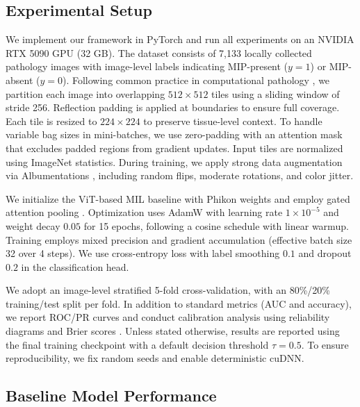 \documentclass[journal,twoside,web]{ieeecolor}
\begin{document}
\subsection{Experimental Setup}\label{S3-1}

We implement our framework in PyTorch and run all experiments on an NVIDIA RTX 5090 GPU (32 GB). The dataset consists of 7,133 locally collected pathology images with image-level labels indicating MIP-present ($y = 1$) or MIP-absent ($y = 0$). Following common practice in computational pathology \cite{campanella2019clinical,lu2021data}, we partition each image into overlapping $512 \times 512$ tiles using a sliding window of stride 256. Reflection padding is applied at boundaries to ensure full coverage. Each tile is resized to $224 \times 224$ to preserve tissue-level context. To handle variable bag sizes in mini-batches, we use zero-padding with an attention mask that excludes padded regions from gradient updates. Input tiles are normalized using ImageNet statistics. During training, we apply strong data augmentation via Albumentations \cite{buslaev2020albumentations}, including random flips, moderate rotations, and color jitter.

We initialize the ViT-based MIL baseline with Phikon weights \cite{filiot2023scaling} and employ gated attention pooling \cite{ilse2018attention}. Optimization uses AdamW \cite{loshchilov2017decoupled} with learning rate $1 \times 10^{-5}$ and weight decay $0.05$ for 15 epochs, following a cosine schedule with linear warmup. Training employs mixed precision \cite{micikevicius2017mixed} and gradient accumulation (effective batch size 32 over 4 steps). We use cross-entropy loss with label smoothing $0.1$ \cite{szegedy2016rethinking} and dropout $0.2$ in the classification head.

We adopt an image-level stratified 5-fold cross-validation, with an 80\%/20\% training/test split per fold. In addition to standard metrics (AUC and accuracy), we report ROC/PR curves and conduct calibration analysis using reliability diagrams and Brier scores \cite{guo2017calibration}. Unless stated otherwise, results are reported using the final training checkpoint with a default decision threshold $\tau = 0.5$. To ensure reproducibility, we fix random seeds and enable deterministic cuDNN. 

\subsection{Baseline Model Performance}\label{S3-2}
\end{document}

